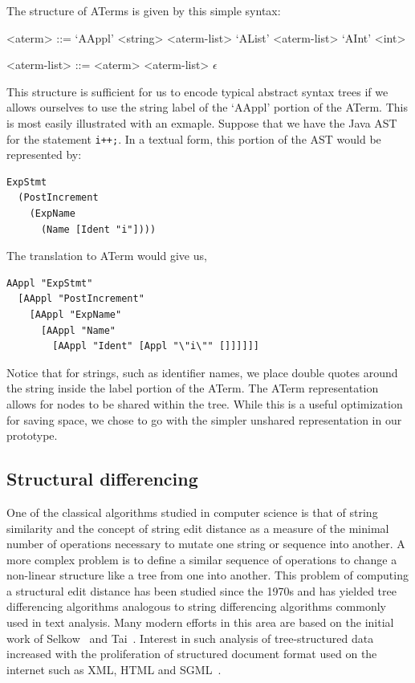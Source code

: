 The structure of ATerms is given by this simple syntax:
\setlength{\grammarindent}{8em}
\begin{grammar}
<aterm> ::= `AAppl' <string> <aterm-list>
\alt `AList' <aterm-list>
\alt `AInt' <int>

<aterm-list> ::= <aterm> <aterm-list>
\alt $\epsilon$
\end{grammar}

This structure is sufficient for us to encode typical abstract syntax trees if
we allows ourselves to use the string label of the `AAppl' portion of the
ATerm. This is most easily illustrated with an exmaple.  Suppose that we have
the Java AST for the statement {\tt i++;}.  In a textual form, this portion of
the AST would be represented by:

\begin{verbatim}
ExpStmt
  (PostIncrement
    (ExpName
      (Name [Ident "i"])))
\end{verbatim}

The translation to ATerm would give us,

\begin{verbatim}
AAppl "ExpStmt"
  [AAppl "PostIncrement"
    [AAppl "ExpName"
      [AAppl "Name"
        [AAppl "Ident" [Appl "\"i\"" []]]]]]
\end{verbatim}

Notice that for strings, such as identifier names, we place double quotes
around the string inside the label portion of the ATerm. The ATerm
representation allows for nodes to be shared within the tree. While this is a
useful optimization for saving space, we chose to go with the simpler unshared
representation in our prototype.

\subsection{Structural differencing}

One of the classical algorithms studied in computer science is that of string
similarity and the concept of string edit distance as a measure of the minimal
number of operations necessary to mutate one string or sequence into another.
A more complex problem is to define a similar sequence of operations to change
a non-linear structure like a tree from one into another.  This problem of
computing a structural edit distance has been studied since the  1970s and has
yielded tree differencing algorithms analogous to string differencing
algorithms commonly used in text analysis.  Many modern efforts in this area
are based on the initial work of Selkow~\cite{selkow77tree} and
Tai~\cite{tai79tree}.  Interest in such analysis of tree-structured data
increased with the proliferation of structured document format used on the
internet such as XML, HTML and SGML~\cite{chawathe96change}.

